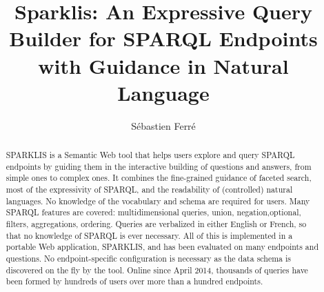 \documentclass[runningheads,a4paper]{llncs}
\begin{document}
\mainmatter

\title{Sparklis: An Expressive Query Builder for SPARQL Endpoints with Guidance in Natural Language}
\author{Sébastien Ferré}

\maketitle

\begin{abstract}
SPARKLIS is a Semantic Web tool that helps users explore and query SPARQL endpoints by guiding them in the interactive building of questions and answers, from simple ones to complex ones. It combines the fine-grained guidance of faceted search, most of the expressivity of SPARQL, and the readability of (controlled) natural languages. No knowledge of the vocabulary and schema are required for users. Many SPARQL features are covered: multidimensional queries, union, negation,optional, filters, aggregations, ordering. Queries are verbalized in either English or French, so that no knowledge of SPARQL is ever necessary. All of this is implemented in a portable Web application, SPARKLIS, and has been evaluated on many endpoints and questions. No endpoint-specific configuration is necessary as the data schema is discovered on the fly by the tool. Online since April 2014, thousands of queries have been formed by hundreds of users over more than a hundred endpoints.

\end{abstract}
\end{document}
